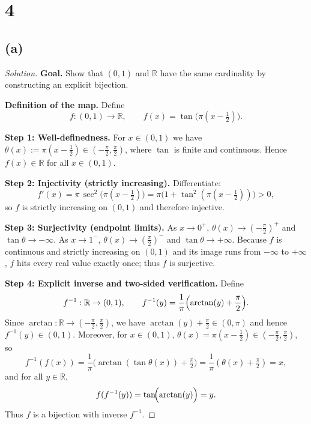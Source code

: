 \documentclass[12pt,a4paper]{article}
\theoremstyle{definition}
\theoremstyle{remark}
\newenvironment{solution}{\begin{proof}[Solution]}{\end{proof}}
\begin{document}
\section*{4}
\subsection*{(a)}
\begin{solution}
\textbf{Goal.} Show that $(0,1)$ and $\mathbb{R}$ have the same cardinality by constructing an explicit bijection.

\textbf{Definition of the map.} Define
\[
f:(0,1)\to\mathbb{R},\qquad f(x)=\tan\!\bigl(\pi(x-\tfrac{1}{2})\bigr).
\]

\textbf{Step 1: Well-definedness.} For $x\in(0,1)$ we have $\theta(x):=\pi(x-\tfrac{1}{2})\in(-\tfrac{\pi}{2},\tfrac{\pi}{2})$, where $\tan$ is finite and continuous. Hence $f(x)\in\mathbb{R}$ for all $x\in(0,1)$.

\textbf{Step 2: Injectivity (strictly increasing).} Differentiate:
\[
f'(x)=\pi\,\sec^2\!\bigl(\pi(x-\tfrac{1}{2})\bigr)=\pi\bigl(1+\tan^2(\pi(x-\tfrac{1}{2}))\bigr)>0,
\]
so $f$ is strictly increasing on $(0,1)$ and therefore injective.

\textbf{Step 3: Surjectivity (endpoint limits).} As $x\to 0^+$, $\theta(x)\to(-\tfrac{\pi}{2})^+$ and $\tan\theta\to-\infty$. As $x\to 1^-$, $\theta(x)\to(\tfrac{\pi}{2})^-$ and $\tan\theta\to+\infty$. Because $f$ is continuous and strictly increasing on $(0,1)$ and its image runs from $-\infty$ to $+\infty$, $f$ hits every real value exactly once; thus $f$ is surjective.

\textbf{Step 4: Explicit inverse and two-sided verification.} Define
\[
f^{-1}:\mathbb{R}\to(0,1),\qquad f^{-1}(y)=\frac{1}{\pi}\Bigl(\arctan(y)+\frac{\pi}{2}\Bigr).
\]
Since $\arctan:\mathbb{R}\to(-\tfrac{\pi}{2},\tfrac{\pi}{2})$, we have $\arctan(y)+\tfrac{\pi}{2}\in(0,\pi)$ and hence $f^{-1}(y)\in(0,1)$. Moreover, for $x\in(0,1)$, $\theta(x)=\pi(x-\tfrac{1}{2})\in(-\tfrac{\pi}{2},\tfrac{\pi}{2})$, so
\[
f^{-1}(f(x))=\frac{1}{\pi}\bigl(\arctan(\tan\theta(x))+\tfrac{\pi}{2}\bigr)=\frac{1}{\pi}(\theta(x)+\tfrac{\pi}{2})=x,
\]
and for all $y\in\mathbb{R}$,
\[
f(f^{-1}(y))=\tan\!\Bigl(\arctan(y)\Bigr)=y.
\]
Thus $f$ is a bijection with inverse $f^{-1}$.


\end{solution}
\end{document}
